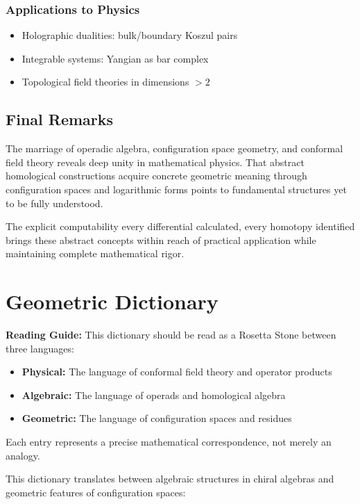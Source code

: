 \subsubsection{Applications to Physics}
\begin{itemize}
\item Holographic dualities: bulk/boundary Koszul pairs
\item Integrable systems: Yangian as bar complex
\item Topological field theories in dimensions $> 2$
\end{itemize}
 
\subsection{Final Remarks}
 
The marriage of operadic algebra, configuration space geometry, and conformal field theory reveals deep unity in mathematical physics. That abstract homological constructions acquire concrete geometric meaning through configuration spaces and logarithmic forms points to fundamental structures yet to be fully understood.
 
The explicit computability every differential calculated, every homotopy identified brings these abstract concepts within reach of practical application while maintaining complete mathematical rigor.
 
\appendix
\section{Geometric Dictionary}

\textbf{Reading Guide:} This dictionary should be read as a Rosetta Stone between three languages:
\begin{itemize}
\item \textbf{Physical:} The language of conformal field theory and operator products
\item \textbf{Algebraic:} The language of operads and homological algebra  
\item \textbf{Geometric:} The language of configuration spaces and residues
\end{itemize}
Each entry represents a precise mathematical correspondence, not merely an analogy.


This dictionary translates between algebraic structures in chiral algebras and geometric features of configuration spaces:

